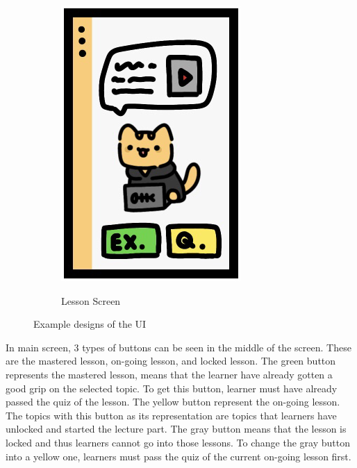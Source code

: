 \begin{figure}[!htbp]
\begin{subfigure}[b]{0.203\linewidth}
    		\includegraphics[width=\textwidth]{Lecture.png}\\
    		\caption{Lesson Screen}
    	\end{subfigure}
    	\caption{Example designs of the UI}
    	\label{fig:UI Ex}
    \end{figure}
    
\newpage

In main screen, 3 types of buttons can be seen in the middle of the screen. These are the mastered lesson, on-going lesson, and locked lesson. The green button represents the mastered lesson, means that the learner have already gotten a good grip on the selected topic. To get this button, learner must have already passed the quiz of the lesson. The yellow button represent the on-going lesson. The topics with this button as its representation are topics that learners have unlocked and started the lecture part. The gray button means that the lesson is locked and thus learners cannot go into those lessons. To change the gray button into a yellow one, learners must pass the quiz of the current on-going lesson first.

